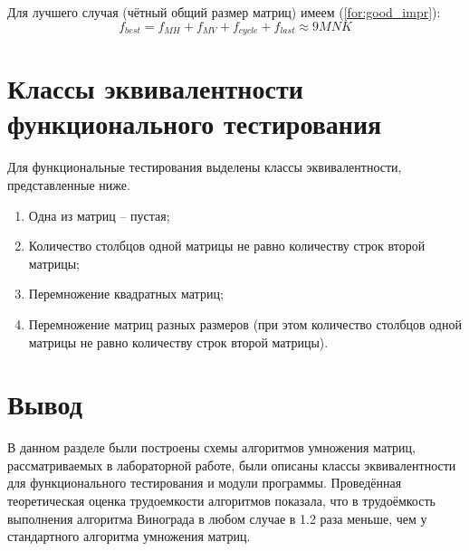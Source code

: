 Для лучшего случая (чётный общий размер матриц) имеем (\ref{for:good_impr}):
\begin{equation}
	\label{for:good_impr}
	f_{best} = f_{MH} + f_{MV} + f_{cycle} + f_{last} \approx 9MNK
\end{equation}


\section{Классы эквивалентности функционального тестирования}

Для функциональные тестирования выделены классы эквивалентности, представленные ниже.

\begin{enumerate}
	\item Одна из матриц -- пустая;
	\item Количество столбцов одной матрицы не равно количеству строк второй матрицы;
	\item Перемножение квадратных матриц;
	\item Перемножение матриц разных размеров (при этом количество столбцов одной матрицы не равно количеству строк второй матрицы).
\end{enumerate}


\section{Вывод}

В данном разделе были построены схемы алгоритмов умножения матриц, рассматриваемых в лабораторной работе, были описаны классы эквивалентности для функционального тестирования и модули программы.
Проведённая теоретическая оценка трудоемкости алгоритмов показала, что в трудоёмкость выполнения алгоритма Винограда в любом случае в 1.2 раза меньше, чем у стандартного алгоритма умножения матриц.
